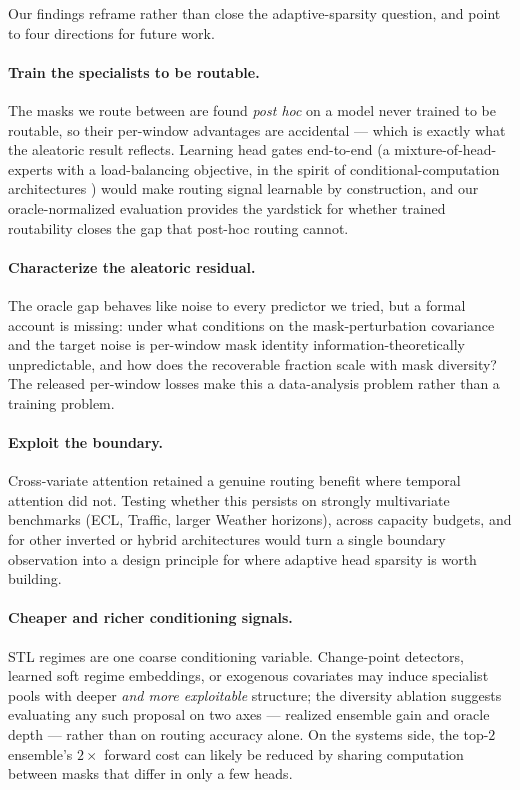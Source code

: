Our findings reframe rather than close the adaptive-sparsity
question, and point to four directions for future work.

\paragraph{Train the specialists to be routable.}
The masks we route between are found \emph{post hoc} on a model never
trained to be routable, so their per-window advantages are accidental ---
which is exactly what the aleatoric result reflects. Learning head gates
end-to-end (a mixture-of-head-experts with a load-balancing objective, in
the spirit of conditional-computation architectures
\citep{han2021dynamic,rao2021dynamicvit}) would make routing signal
learnable by construction, and our oracle-normalized evaluation provides
the yardstick for whether trained routability closes the gap that
post-hoc routing cannot.

\paragraph{Characterize the aleatoric residual.}
The oracle gap behaves like noise to every predictor we tried, but a
formal account is missing: under what conditions on the mask-perturbation
covariance and the target noise is per-window mask identity
information-theoretically unpredictable, and how does the recoverable
fraction scale with mask diversity? The released per-window losses make
this a data-analysis problem rather than a training problem.

\paragraph{Exploit the boundary.}
Cross-variate attention retained a genuine routing benefit where temporal
attention did not. Testing whether this persists on strongly multivariate
benchmarks (ECL, Traffic, larger Weather horizons), across capacity
budgets, and for other inverted or hybrid architectures would turn a
single boundary observation into a design principle for where adaptive
head sparsity is worth building.

\paragraph{Cheaper and richer conditioning signals.}
STL regimes are one coarse conditioning variable. Change-point detectors,
learned soft regime embeddings, or exogenous covariates may induce
specialist pools with deeper \emph{and more exploitable} structure; the
diversity ablation suggests evaluating any such proposal on two axes ---
realized ensemble gain and oracle depth --- rather than on routing
accuracy alone. On the systems side, the top-$2$ ensemble's $2\times$
forward cost can likely be reduced by sharing computation between masks
that differ in only a few heads.
